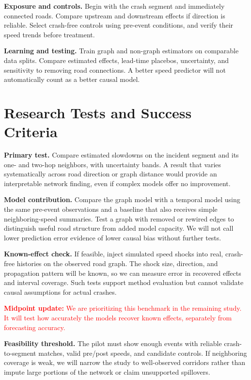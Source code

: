 \documentclass[sigconf,nonacm]{acmart}
\begin{document}
\textbf{Exposure and controls.} Begin with the crash segment and
immediately connected roads. Compare upstream and downstream effects
if direction is reliable. Select crash-free controls using pre-event
conditions, and verify their speed trends before treatment.

\textbf{Learning and testing.} Train graph and non-graph estimators on
comparable data splits. Compare estimated effects, lead-time placebos,
uncertainty, and sensitivity to removing road connections. A better
speed predictor will not automatically count as a better causal model.

\section{Research Tests and Success Criteria}
\textbf{Primary test.} Compare estimated slowdowns on the incident
segment and its one- and two-hop neighbors, with uncertainty bands.
A result that varies systematically across road direction or graph
distance would provide an interpretable network finding, even if
complex models offer no improvement.

\textbf{Model contribution.} Compare the graph model with a temporal
model using the same pre-event observations and a baseline that also
receives simple neighboring-speed summaries. Test a graph with removed
or rewired edges to distinguish useful road structure from added model
capacity. We will not call lower prediction error evidence of lower
causal bias without further tests.

\textbf{Known-effect check.} If feasible, inject simulated speed
shocks into real, crash-free histories on the observed road graph. The
shock size, direction, and propagation pattern will be known, so we
can measure error in recovered effects and interval coverage. Such
tests support method evaluation but cannot validate causal assumptions
for actual crashes.

\textcolor{red}{\textbf{Midpoint update:} We are prioritizing this
benchmark in the remaining study. It will test how accurately the
models recover known effects, separately from forecasting accuracy.}

\textbf{Feasibility threshold.} The pilot must show enough events with
reliable crash-to-segment matches, valid pre/post speeds, and candidate
controls. If neighboring coverage is weak, we will narrow the study
to well-observed corridors rather than impute large portions of the
network or claim unsupported spillovers.
\end{document}
